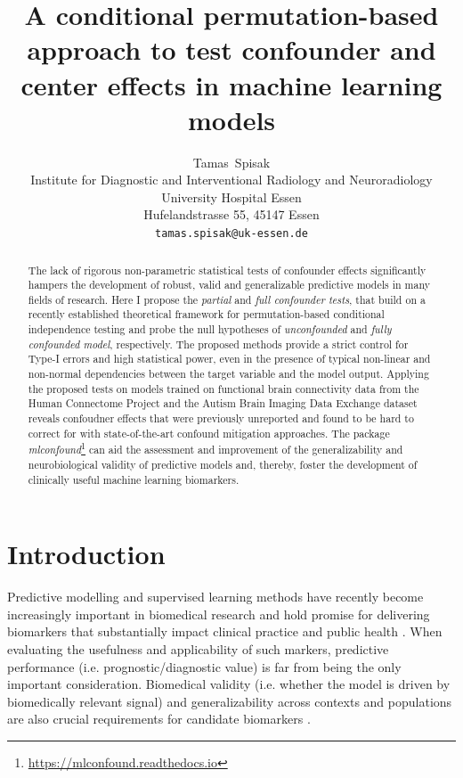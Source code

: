 \documentclass{article}
\title{A conditional permutation-based approach to test confounder and center effects in machine learning models}
\author{
  Tamas~Spisak \\
  Institute for Diagnostic and Interventional Radiology and Neuroradiology \\
  University Hospital Essen\\
  Hufelandstrasse 55, 45147 Essen \\
  \texttt{tamas.spisak@uk-essen.de} \\
}
\begin{document}
\maketitle

\begin{abstract} %
The lack of rigorous non-parametric statistical tests of confounder effects significantly hampers the development of robust, valid and generalizable predictive models in many fields of research.
Here I propose the \emph{partial} and \emph{full confounder tests}, that build on a recently established theoretical framework for permutation-based conditional independence testing and probe the null hypotheses of \emph{unconfounded} and \emph{fully confounded model}, respectively.
The proposed methods provide a strict control for Type-I errors and high statistical power, even in the presence of typical non-linear and non-normal dependencies between the target variable and the model output.
Applying the proposed tests on models trained on functional brain connectivity data from the Human Connectome Project and the Autism Brain Imaging Data Exchange dataset reveals confoudner effects that were previously unreported and found to be hard to correct for with state-of-the-art confound mitigation approaches.
The package \emph{mlconfound}\footnote{\href{https://mlconfound.readthedocs.io}{https://mlconfound.readthedocs.io}} can aid the assessment and improvement of the generalizability and neurobiological validity of predictive models and, thereby, foster the development of clinically useful machine learning biomarkers.
\end{abstract}



\section{Introduction}

Predictive modelling and supervised learning methods have recently become increasingly important in biomedical research and hold promise for delivering biomarkers that substantially impact clinical practice and public health \citep{kent2018personalized}. When evaluating the usefulness and applicability of such markers, predictive performance (i.e. prognostic/diagnostic value) is far from being the only important consideration. Biomedical validity (i.e. whether the model is driven by biomedically relevant signal) and generalizability across contexts and populations are also crucial requirements for candidate biomarkers \citep{woo2017building}.
\end{document}
